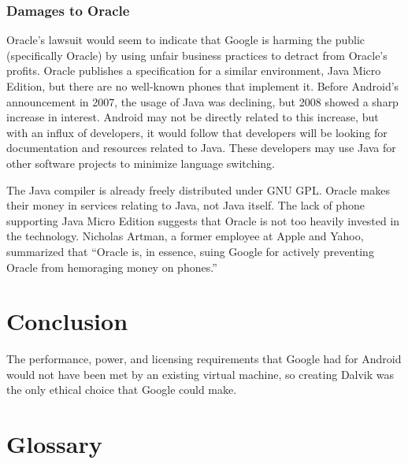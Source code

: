 \documentclass[11pt]{article}
\begin{document}
\begin{multicols}{2}
\subsubsection{Damages to Oracle} %
\label{ssub:oracle-damage}

Oracle's lawsuit would seem to indicate that Google is harming the public
(specifically Oracle) by using unfair business practices to detract from
Oracle's profits.  Oracle publishes a specification for a similar environment,
Java Micro Edition, but there are no well-known phones that implement it.
Before Android's announcement in 2007, the usage of Java was declining, but 2008
showed a sharp increase in interest.  \cite{tiobe}  Android may not be directly
related to this increase, but with an influx of developers, it would follow that
developers will be looking for documentation and resources related to Java.
These developers may use Java for other software projects to minimize language
switching.

The Java compiler is already freely distributed under GNU GPL.  Oracle makes
their money in services relating to Java, not Java itself.  The lack of phone
supporting Java Micro Edition suggests that Oracle is not too heavily invested
in the technology.  Nicholas Artman, a former employee at Apple and Yahoo,
summarized that ``Oracle is, in essence, suing Google for actively preventing
Oracle from hemoraging money on phones.'' \cite{artman}




\section{Conclusion} %
\label{sec:conclusion}

The performance, power, and licensing requirements that Google had for Android
would not have been met by an existing virtual machine, so creating Dalvik was
the only ethical choice that Google could make.


\appendix

\section{Glossary} %
\label{sec:glossary}


\end{multicols}
\end{document}
